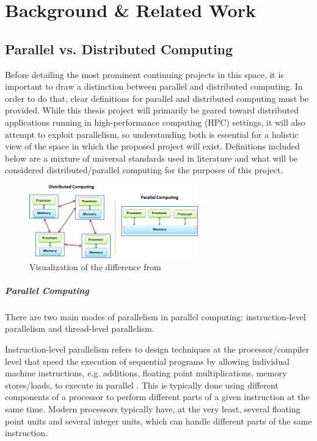 \chapter{Background \& Related Work}

\section{Parallel vs. Distributed Computing}
Before detailing the most prominent continuing projects in this space, it is important to draw a distinction between parallel and distributed computing. In order to do that, clear definitions for parallel and distributed computing must be provided. While this thesis project will primarily be geared toward distributed applications running in high-performance computing (HPC) settings, it will also attempt to exploit parallelism, so understanding both is essential for a holistic view of the space in which the proposed project will exist. Definitions included below are a mixture of universal standards used in literature and what will be considered distributed/parallel computing for the purposes of this project.

\begin{figure}[h]
\centering
\includegraphics[width=0.65\textwidth]{Figures/parallel_vs_distributed.png}
\caption{Visualization of the difference from \cite{dist_java}}
\label{fig:dist_v_parallel}
\end{figure}

\paragraph{Parallel Computing}
There are two main modes of parallelism in parallel computing: instruction-level parallelism and thread-level parallelism. 

Instruction-level parallelism refers to design techniques at the processor/compiler level that speed the execution of sequential programs by allowing individual machine instructions, e.g. additions, floating point multiplications, memory stores/loads, to execute in parallel \cite{ilp_history}. This is typically done using different components of a processor to perform different parts of a given instruction at the same time. Modern processors typically have, at the very least, several floating point units and several integer units, which can handle different parts of the same instruction. 

